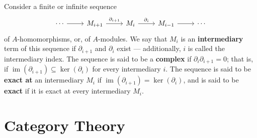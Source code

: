 \documentclass[12pt,reqno]{amsart}
\theoremstyle{plain}
\DeclareMathOperator{\im}{im}
\begin{document}
Consider a finite or infinite sequence
$$\begin{tikzcd}
\cdots \arrow[r] & M_{i+1} \arrow[r, "\partial_{i+1}"] & M_i \arrow[r, "\partial_i"] & M_{i-1} \arrow[r] & \cdots
\end{tikzcd}$$ of $A$-homomorphisms, or, of $A$-modules. We say that $M_i$ is an \textbf{intermediary} term of this sequence if $\partial_{i+1}$ and $\partial_i$ exist — additionally, $i$ is called the intermediary index. The sequence is said to be a \textbf{complex} if $\partial_i \partial_{i+1} = 0$; that is, if $ \im (\partial_{i+1}) \subseteq \ker (\partial_i)$ for every intermediary $i$. The sequence is said to be \textbf{exact at} an intermediary $M_i$ if $\im (\partial_{i+1}) = \ker (\partial_i)$, and is said to be \textbf{exact} if it is exact at every intermediary $M_i$. 
\newpage
\section{Category Theory}
\end{document}
